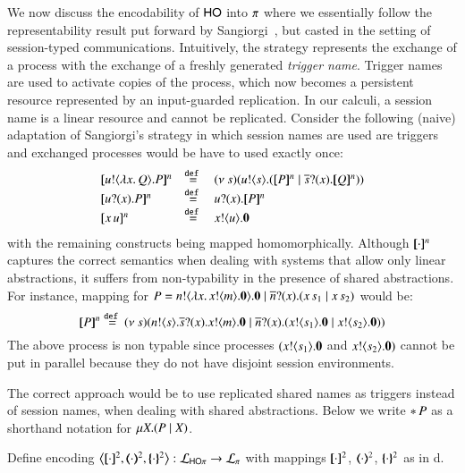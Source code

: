 We now discuss the encodability of  $\mathsf{HO}$ into $\pi$ where
we essentially follow the representability result put forward by 
Sangiorgi~\cite{San92,SaWabook}, but casted in the 
setting of session-typed communications. 
Intuitively, the strategy represents the exchange of a process 
with the exchange of a freshly generated \emph{trigger name}. 
Trigger names are used to activate copies of the process, 
which now becomes a persistent 
resource represented by an input-guarded replication.
In our calculi, a session name 
is a linear resource and cannot be replicated.
Consider the following (naive) adaptation of 
Sangiorgi's strategy in which session names are used are triggers and 
exchanged processes would be have to used exactly once:
%
\[
	\begin{array}{lcl}
		\pmap{\bout{u}{\abs{x}{Q}} P}{n} & \defeq &  \newsp{s}{\bout{u}{s} (\pmap{P}{n} \Par \binp{\dual{s}}{x} \pmap{Q}{n})} \\
		\pmap{\binp{u}{x} P}{n} & \defeq& \binp{u}{x} \pmap{P}{n}\\
		\pmap{\appl{x}{u}}{n} & \defeq & \bout{x}{u} \inact
	\end{array}
\]
%
with the remaining \HOp constructs being mapped homomorphically.
Although $[\!\![\cdot]\!\!]^{n}$ captures the correct semantics when
dealing with systems that allow only linear abstractions,
it suffers from non-typability in the presence
of shared abstractions. For instance,
mapping for $P = n ! \langle \lambda x.\,x ! \langle m \rangle .\mathbf{0} \rangle . \mathbf{0} \;|\; \overline{n} ? (x) . (x\,s_1 \;|\; x\,s_2)$
would be:
%
\[
	[\!\![P]\!\!]^{n} \stackrel{\mathtt{def}\ }{=}
	(\nu\ s)(n ! \langle s \rangle . \overline{s} ? (x) . x ! \langle m \rangle . \mathbf{0} \;|\; \overline{n} ? (x) . (x ! \langle s_1 \rangle . \mathbf{0} \;|\; x ! \langle s_2 \rangle . \mathbf{0}))
\]
%
The above process is non typable since processes $(x ! \langle s_1 \rangle . \mathbf{0}$ and $x ! \langle s_2 \rangle . \mathbf{0})$
cannot be put in parallel because they do not have disjoint session environments.

The correct approach would be to use replicated shared names
as triggers instead of session names, when dealing with shared abstractions. 
Below we write $\ast\,{} P$ as a shorthand notation for $\mu X. (P \;|\; X)$.

\begin{definition}\myrm
	\label{def:enc:HOp_to_p}
	Define encoding
	$\enco{\map{\cdot}^2, \mapt{\cdot}^2, \mapa{\cdot}^2}: \tyl{L}_{\HOp} \to \tyl{L}_{\sessp}$
	with mappings 
	$[\!\![\cdot]\!\!]^{2}$, $(\!\!\langle\cdot\rangle\!\!)^{2}$, $\{\!\!\{\cdot\}\!\!\}^{2}$ as
	in d.
\end{definition}
%

